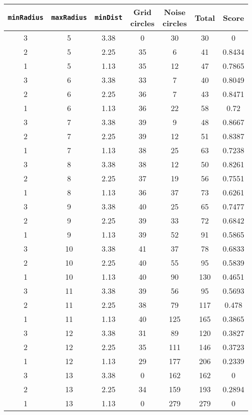 \documentclass[letterpaper, 12pt]{article}
\begin{document}
\begin{longtable}{|c|c|c|c|c|c|c|}
\hline
\textbf{\texttt{minRadius}} & \textbf{\texttt{maxRadius}} & \textbf{\texttt{minDist}} & \textbf{Grid circles} & \textbf{Noise circles} & \textbf{Total} & \textbf{Score} \\
\hline
3 & 5 & 3.38 & 0 & 30 & 30 & 0 \\
\hline
2 & 5 & 2.25 & 35 & 6 & 41 & 0.8434 \\
\hline
1 & 5 & 1.13 & 35 & 12 & 47 & 0.7865 \\
\hline
3 & 6 & 3.38 & 33 & 7 & 40 & 0.8049 \\
\hline
2 & 6 & 2.25 & 36 & 7 & 43 & 0.8471 \\
\hline
1 & 6 & 1.13 & 36 & 22 & 58 & 0.72 \\
\hline
3 & 7 & 3.38 & 39 & 9 & 48 & 0.8667 \\
\hline
2 & 7 & 2.25 & 39 & 12 & 51 & 0.8387 \\
\hline
1 & 7 & 1.13 & 38 & 25 & 63 & 0.7238 \\
\hline
3 & 8 & 3.38 & 38 & 12 & 50 & 0.8261 \\
\hline
2 & 8 & 2.25 & 37 & 19 & 56 & 0.7551 \\
\hline
1 & 8 & 1.13 & 36 & 37 & 73 & 0.6261 \\
\hline
3 & 9 & 3.38 & 40 & 25 & 65 & 0.7477 \\
\hline
2 & 9 & 2.25 & 39 & 33 & 72 & 0.6842 \\
\hline
1 & 9 & 1.13 & 39 & 52 & 91 & 0.5865 \\
\hline
3 & 10 & 3.38 & 41 & 37 & 78 & 0.6833 \\
\hline
2 & 10 & 2.25 & 40 & 55 & 95 & 0.5839 \\
\hline
1 & 10 & 1.13 & 40 & 90 & 130 & 0.4651 \\
\hline
3 & 11 & 3.38 & 39 & 56 & 95 & 0.5693 \\
\hline
2 & 11 & 2.25 & 38 & 79 & 117 & 0.478 \\
\hline
1 & 11 & 1.13 & 40 & 125 & 165 & 0.3865 \\
\hline
3 & 12 & 3.38 & 31 & 89 & 120 & 0.3827 \\
\hline
2 & 12 & 2.25 & 35 & 111 & 146 & 0.3723 \\
\hline
1 & 12 & 1.13 & 29 & 177 & 206 & 0.2339 \\
\hline
3 & 13 & 3.38 & 0 & 162 & 162 & 0 \\
\hline
2 & 13 & 2.25 & 34 & 159 & 193 & 0.2894 \\
\hline
1 & 13 & 1.13 & 0 & 279 & 279 & 0 \\

\end{longtable}
\end{document}
